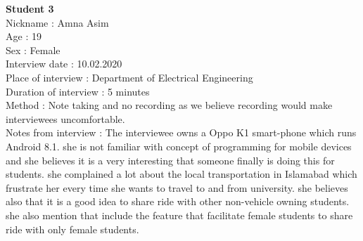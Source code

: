 \large{\textbf{Student 3}} 
\\ Nickname : Amna Asim 
\\ Age : 19 
\\ Sex : Female 
\\ Interview date : 10.02.2020 
\\ Place of interview : Department of Electrical Engineering
\\ Duration of interview : 5 minutes 
\\ Method : Note taking and no recording as we believe recording would make interviewees uncomfortable.
\\ Notes from interview : The interviewee owns a Oppo K1 smart-phone which runs Android 8.1. she is not familiar with concept of programming for mobile devices and she believes it is a very interesting that someone finally is doing this for students. she complained a lot about the local transportation in Islamabad which frustrate her every time she wants to travel to and from university. she believes also that it is a good idea to share ride with other non-vehicle owning students. she also mention that include the feature that facilitate female students to share ride with only female students.
 
